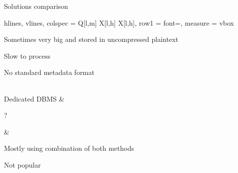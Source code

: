 \begin{frame}{Solutions comparison}
\begin{table}[!htb]
\begin{tblr}{
      hlines, vlines,
      colspec = {Q[l,m] X[l,h] X[l,h]},
      row{1} = {font=\bfseries},
      measure = vbox
    }
\begin{itemizesmall}
          \item Sometimes very big and stored in uncompressed plaintext
          \item Slow to process
          \item No standard metadata format
        \end{itemizesmall}\vspace{\baselineskip} \\
    Dedicated DBMS
        & \begin{itemizesmall}
          \item ?
        \end{itemizesmall}
        & \begin{itemizesmall}
          \item Mostly using combination of both methods
          \item Not popular
        \end{itemizesmall}\vspace{\baselineskip} \\
    \end{tblr}
  \end{table}
\end{frame}

